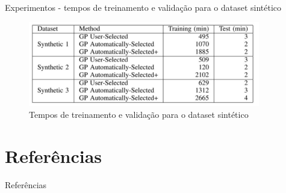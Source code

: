 \documentclass{beamer}
\begin{document}
  \begin{frame}{Experimentos - tempos de treinamento e validação para o dataset sintético}
      \begin{figure}
          \centering
          \includegraphics[width=0.9\textwidth]{tempos.png}
          \caption{Tempos de treinamento e validação para o dataset sintético \cite{geneticrl}}
          \label{fig:tempos}
      \end{figure}
  \end{frame}


  \section{Referências}
      \begin{frame}{Referências}
          
          
      \end{frame}
\end{document}
